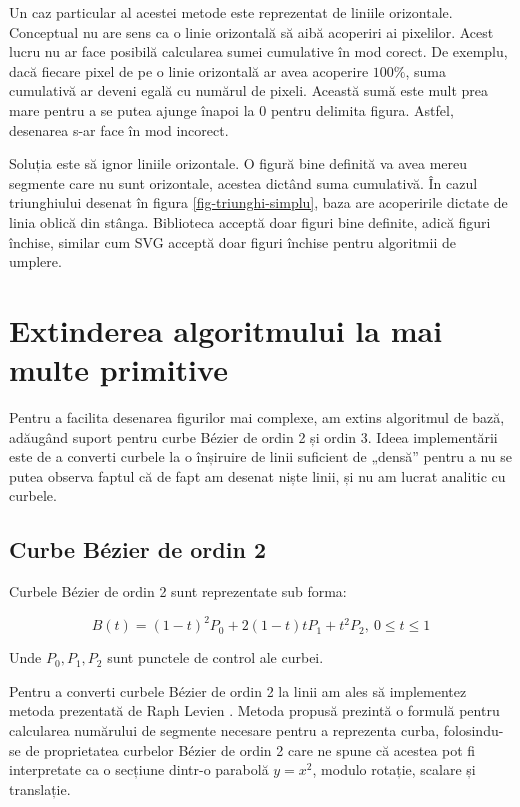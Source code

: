 \documentclass[a4paper, 12pt]{report}
\begin{document}
Un caz particular al acestei metode este reprezentat de liniile orizontale. Conceptual nu are sens ca o linie
orizontală să aibă acoperiri ai pixelilor. Acest lucru nu ar face posibilă calcularea sumei cumulative în mod corect.
De exemplu, dacă fiecare pixel de pe o linie orizontală ar avea acoperire \(100\%\), suma cumulativă ar deveni egală
cu numărul de pixeli. Această sumă este mult prea mare pentru a se putea ajunge înapoi la 0 pentru delimita figura.
Astfel, desenarea s-ar face în mod incorect.

Soluția este să ignor liniile orizontale. O figură bine definită va avea mereu segmente care nu sunt orizontale,
acestea dictând suma cumulativă. În cazul triunghiului desenat în figura \ref{fig-triunghi-simplu}, baza are acoperirile
dictate de linia oblică din stânga. Biblioteca acceptă doar figuri bine definite, adică figuri închise, similar cum SVG
acceptă doar figuri închise pentru algoritmii de umplere.

\chapter{Extinderea algoritmului la mai multe primitive}

Pentru a facilita desenarea figurilor mai complexe, am extins algoritmul de bază, adăugând suport pentru curbe Bézier
de ordin 2 și ordin 3. Ideea implementării este de a converti curbele la o înșiruire de linii suficient de „densă” pentru
a nu se putea observa faptul că de fapt am desenat niște linii, și nu am lucrat analitic cu curbele.

\section{Curbe Bézier de ordin 2}

Curbele Bézier de ordin 2 sunt reprezentate sub forma:

\[
    B(t) = (1 - t)^2 P_0 + 2 (1 - t) t P_1 + t^2 P_2, \ 0 \leq t \leq 1
\]

Unde \(P_0, P_1, P_2\) sunt punctele de control ale curbei.

Pentru a converti curbele Bézier de ordin 2 la linii am ales să implementez metoda prezentată de Raph Levien
\cite{FlatteningQuadraticBezierCurves}. Metoda propusă prezintă o formulă pentru calcularea numărului de segmente
necesare pentru a reprezenta curba, folosindu-se de proprietatea curbelor Bézier de ordin 2 care ne spune că acestea
pot fi interpretate ca o secțiune dintr-o parabolă \(y = x^2\), modulo rotație, scalare și translație.
\end{document}
